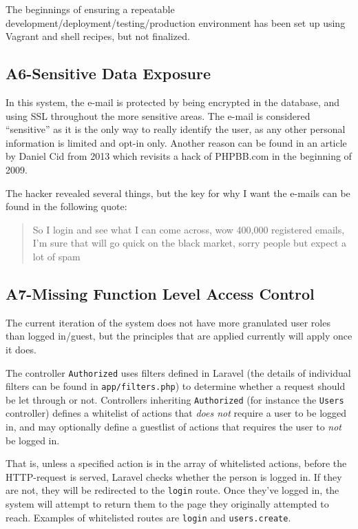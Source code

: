 The beginnings of ensuring a repeatable development/deployment/testing/production environment has been set up using Vagrant and shell recipes, but not finalized.

\subsection{A6-Sensitive Data Exposure}
\noindent
In this system, the e-mail is protected by being encrypted in the database, and using SSL throughout the more sensitive areas. The e-mail is considered ``sensitive'' as it is the only way to really identify the user, as any other personal information is limited and opt-in only. Another reason can be found in an article by Daniel Cid \citep{Sucuri2013} from 2013 which revisits a hack of PHPBB.com in the beginning of 2009.

The hacker revealed several things, but the key for why I want the e-mails can be found in the following quote:
\begin{quote}
So I login and see what I can come across, wow 400,000 registered emails, I’m sure that will go quick on the black market, sorry people but expect a lot of spam
\end{quote}

\subsection{A7-Missing Function Level Access Control}
\noindent
The current iteration of the system does not have more granulated user roles than logged in/guest, but the principles that are applied currently will apply once it does.

The controller \texttt{Authorized} uses filters defined in Laravel (the details of individual filters can be found in \texttt{app/filters.php}) to determine whether a request should be let through or not. Controllers inheriting \texttt{Authorized} (for instance the \texttt{Users} controller) defines a whitelist of actions that \emph{does not} require a user to be logged in, and may optionally define a guestlist of actions that requires the user to \emph{not} be logged in.

That is, unless a specified action is in the array of whitelisted actions, before the HTTP-request is served, Laravel checks whether the person is logged in. If they are not, they will be redirected to the \texttt{login} route. Once they've logged in, the system will attempt to return them to the page they originally attempted to reach. Examples of whitelisted routes are \texttt{login} and \texttt{users.create}.

